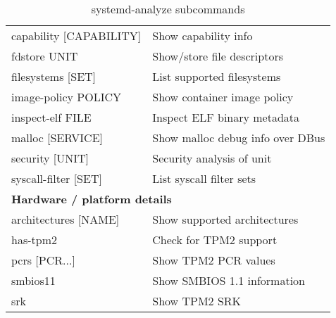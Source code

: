 \documentclass[openany, 12pt]{book}
\begin{document}
\begin{table}
\begin{center}
\begin{tabular}{ll}
      capability [CAPABILITY] & Show capability info                             \\
      fdstore UNIT            & Show/store file descriptors                      \\
      filesystems [SET]       & List supported filesystems                       \\
      image-policy POLICY     & Show container image policy                      \\
      inspect-elf FILE        & Inspect ELF binary metadata                      \\
      malloc [SERVICE]        & Show malloc debug info over DBus                 \\
      security [UNIT]         & Security analysis of unit                        \\
      syscall-filter [SET]    & List syscall filter sets                         \\
      \midrule
      \multicolumn{2}{l}{\textbf{Hardware / platform details}}                   \\
      architectures [NAME]    & Show supported architectures                     \\
      has-tpm2                & Check for TPM2 support                           \\
      pcrs [PCR...]           & Show TPM2 PCR values                             \\
      smbios11                & Show SMBIOS 1.1 information                      \\
      srk                     & Show TPM2 SRK                                    \\
      \bottomrule
    \end{tabular}
  \end{center}
  \caption{systemd-analyze subcommands}
\end{table}

\glsaddallunused{}

\clearpage
\printglossaries

\end{document}

